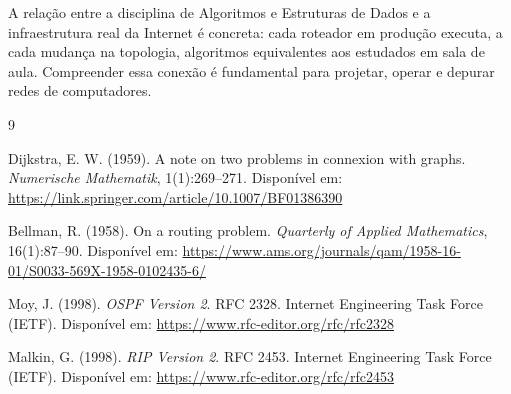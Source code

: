 \documentclass[12pt]{article}
\begin{document}
A relação entre a disciplina de Algoritmos e Estruturas de Dados e a infraestrutura
real da Internet é concreta: cada roteador em produção executa, a cada mudança na
topologia, algoritmos equivalentes aos estudados em sala de aula. Compreender essa
conexão é fundamental para projetar, operar e depurar redes de computadores.


\begin{thebibliography}{9}

Dijkstra, E. W. (1959).
A note on two problems in connexion with graphs.
\textit{Numerische Mathematik}, 1(1):269--271.
Disponível em: \url{https://link.springer.com/article/10.1007/BF01386390}

Bellman, R. (1958).
On a routing problem.
\textit{Quarterly of Applied Mathematics}, 16(1):87--90.
Disponível em: \url{https://www.ams.org/journals/qam/1958-16-01/S0033-569X-1958-0102435-6/}

Moy, J. (1998).
\textit{OSPF Version 2}.
RFC 2328. Internet Engineering Task Force (IETF).
Disponível em: \url{https://www.rfc-editor.org/rfc/rfc2328}

Malkin, G. (1998).
\textit{RIP Version 2}.
RFC 2453. Internet Engineering Task Force (IETF).
Disponível em: \url{https://www.rfc-editor.org/rfc/rfc2453}

\end{thebibliography}
\end{document}
